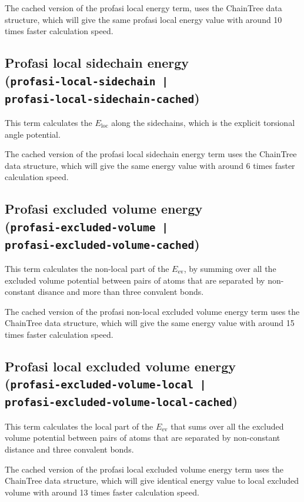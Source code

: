 The cached version of the profasi local energy term, uses the
ChainTree data structure, which will give the same profasi local
energy value with around 10 times faster calculation speed.

\subsection{Profasi local sidechain energy \\(\texttt{profasi-local-sidechain~|}\\\texttt{profasi-local-sidechain-cached})}
This term calculates the $E_{\mathrm{loc}}$ along the sidechains, which is the explicit
torsional angle potential.

The cached version of the profasi local sidechain energy term uses
the ChainTree data structure, which will give the same energy value
with around 6 times faster calculation speed.

\subsection{Profasi excluded volume energy \\(\texttt{profasi-excluded-volume~|}\\\texttt{profasi-excluded-volume-cached})}

This term calculates the non-local part of the $E_{\mathrm{ev}}$,
by summing over all the excluded volume potential between pairs of
atoms that are separated by non-constant disance and more than three
convalent bonds.

The cached version of the profasi non-local excluded volume energy
term uses the ChainTree data structure, which will give the same
energy value with around 15 times faster calculation speed.
 

\subsection{Profasi local excluded volume energy \\(\texttt{profasi-excluded-volume-local~|}\\\texttt{profasi-excluded-volume-local-cached})}

This term calculates the local part of the $E_{\mathrm{ev}}$ that sums
over all the excluded volume potential between pairs of atoms that are
separated by non-constant distance and three convalent bonds.

The cached version of the profasi local excluded volume energy term
uses the ChainTree data structure, which will give identical energy value to
local excluded volume with around 13 times faster calculation speed.
 

